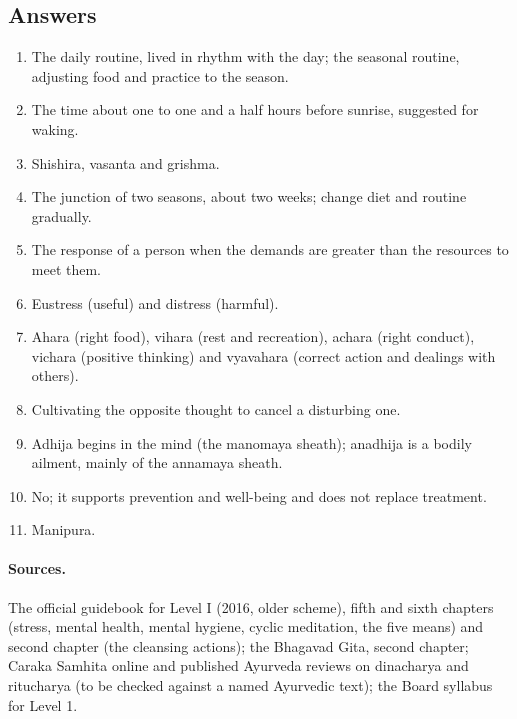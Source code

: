 \subsection*{Answers}
\begin{enumerate}
\item The daily routine, lived in rhythm with the day; the seasonal routine, adjusting food and practice to the season.
\item The time about one to one and a half hours before sunrise, suggested for waking.
\item Shishira, vasanta and grishma.
\item The junction of two seasons, about two weeks; change diet and routine gradually.
\item The response of a person when the demands are greater than the resources to meet them.
\item Eustress (useful) and distress (harmful).
\item Ahara (right food), vihara (rest and recreation), achara (right conduct), vichara (positive thinking) and vyavahara (correct action and dealings with others).
\item Cultivating the opposite thought to cancel a disturbing one.
\item Adhija begins in the mind (the manomaya sheath); anadhija is a bodily ailment, mainly of the annamaya sheath.
\item No; it supports prevention and well-being and does not replace treatment.
\item Manipura.
\end{enumerate}

\paragraph{Sources.} The official guidebook for Level I (2016, older scheme), fifth and sixth chapters (stress, mental health, mental hygiene, cyclic meditation, the five means) and second chapter (the cleansing actions); the Bhagavad Gita, second chapter; Caraka Samhita online and published Ayurveda reviews on dinacharya and ritucharya (to be checked against a named Ayurvedic text); the Board syllabus for Level 1.
